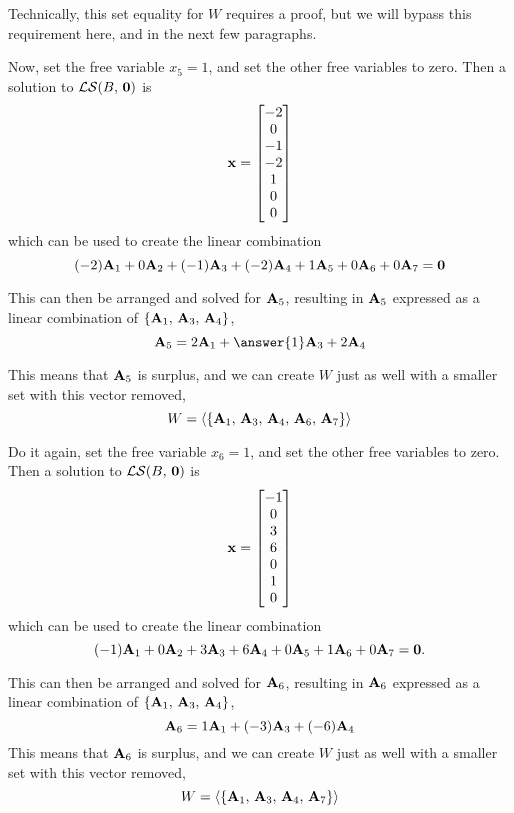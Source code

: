 \documentclass{ximera}
\begin{document}
\begin{example}
  Technically, this set equality for $W$ requires a proof, but we will
  bypass this requirement here, and in the next few paragraphs.

  Now, set the free variable $x_5=1$, and set the other free variables
  to zero.  Then a solution to $\mathcal{LS}\!\left(B,\,\mathbf{0}\right)$ is
  \[
    \mathbf{x}=\begin{bmatrix}-2\\0\\-1\\-2\\1\\0\\0\end{bmatrix}
  \]
  which can be used to create the linear combination
  \[
    (-2)\mathbf{A}_1+
    0\mathbf{A}_2+
    (-1)\mathbf{A}_3+
    (-2)\mathbf{A}_4+
    1\mathbf{A}_5+
    0\mathbf{A}_6+
    0\mathbf{A}_7
    =\mathbf{0}
  \]

  This can then be arranged and solved for $\mathbf{A}_5$, resulting in
  $\mathbf{A}_5$ expressed as a linear combination of
  $\left\{\mathbf{A}_1,\,\mathbf{A}_3,\,\mathbf{A}_4\right\}$,
  \[
    \vect{A}_5=
    2\vect{A}_1+
    \answer{1}\vect{A}_3+
    2\vect{A}_4
  \]

  This means that $\mathbf{A}_5$ is surplus, and we can create $W$ just
  as well with a smaller set with this vector removed,
  \[
    W=\left\langle\left\{\mathbf{A}_1,\,\mathbf{A}_3,\,\mathbf{A}_4,\,\mathbf{A}_6,\,\mathbf{A}_7\right\}\right\rangle
  \]

  Do it again, set the free variable $x_6=1$, and set the other free
  variables to zero.  Then a solution to
  $\mathcal{LS}\!\left(B,\,\mathbf{0}\right)$ is
  \[
    \mathbf{x}=\begin{bmatrix}-1\\0\\3\\6\\0\\1\\0\end{bmatrix}
  \]
  which can be used to create the linear combination
  \[
    (-1)\mathbf{A}_1+
    0\mathbf{A}_2+
    3\mathbf{A}_3+
    6\mathbf{A}_4+
    0\mathbf{A}_5+
    1\mathbf{A}_6+
    0\mathbf{A}_7
    =\mathbf{0}.
  \]

  This can then be arranged and solved for $\mathbf{A}_6$, resulting in
  $\mathbf{A}_6$ expressed as a linear combination of
  $\left\{\mathbf{A}_1,\,\mathbf{A}_3,\,\mathbf{A}_4\right\}$,
  \[
    \mathbf{A}_6=
    1\mathbf{A}_1+
    (-3)\mathbf{A}_3+
    (-6)\mathbf{A}_4
  \]
  This means that $\mathbf{A}_6$ is surplus, and we can create $W$ just
  as well with a smaller set with this vector removed,
  \[
    W=\left\langle\left\{\mathbf{A}_1,\,\mathbf{A}_3,\,\mathbf{A}_4,\,\mathbf{A}_7\right\}\right\rangle
  \]


\end{example}
\end{document}
